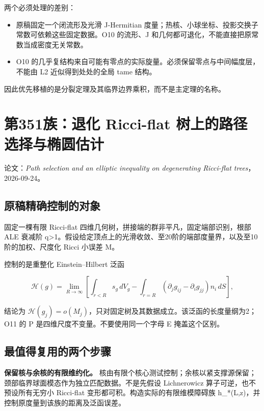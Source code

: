 \documentclass[UTF8,11pt,openany,oneside,fontset=none]{ctexbook}
\providecommand{\tightlist}{\setlength{\itemsep}{1pt}\setlength{\parskip}{0pt}}
\begin{document}
两个必须处理的差别：

\begin{itemize}
\tightlist
\item
  原稿固定一个闭流形及光滑 J-Hermitian 度量；热核、小球坐标、投影交换子常数可依赖这些固定数据。O10 的流形、J 和几何都可退化，不能直接把原常数当成密度无关常数。
\item
  O10 的几乎复结构来自可能有零点的实际旋量。必须保留零点与中间幅度层，不能由 L2 近似得到处处的全局 tame 结构。
\end{itemize}

因此优先移植的是分裂定理及其临界边界乘积，而不是主定理的名称。

\section{第351族：退化 Ricci-flat 树上的路径选择与椭圆估计}\label{ch6:ux7b2c351ux65cfux9000ux5316-ricci-flat-ux6811ux4e0aux7684ux8defux5f84ux9009ux62e9ux4e0eux692dux5706ux4f30ux8ba1}

论文：\emph{Path selection and an elliptic inequality on degenerating Ricci-flat trees}，2026-09-24。\cite{OAITree}

\subsection{原稿精确控制的对象}\label{ch6:ux539fux7a3fux7cbeux786eux63a7ux5236ux7684ux5bf9ux8c61}

固定一棵有限 Ricci-flat 四维几何树，拼接端的群非平凡，固定端部识别，根部 ALE 衰减阶 q\textgreater1。假设给定顶点上的光滑收敛、至20阶的端部度量界，以及至10阶的加权、尺度化 Ricci 小误差 M。

控制的是重整化 Einstein--Hilbert 泛函

\[
\mathscr H(g)=\lim_{R\to\infty}
\left[\int_{r<R}s_g\,dV_g-
\int_{r=R}(\partial_jg_{ij}-\partial_ig_{jj})n_i\,dS\right],
\]

结论为 \(\mathscr H(g_j)=o(M_j)\)，只对固定树及其数据成立。该泛函的长度量纲为2；O11 的 P 是四维尺度不变量。不要使用同一个字母 E 掩盖这个区别。

\subsection{最值得复用的两个步骤}\label{ch6:ux6700ux503cux5f97ux590dux7528ux7684ux4e24ux4e2aux6b65ux9aa4}

\textbf{保留核与余核的有限维约化。} 核由有限个核心测试控制；余核以紧支撑源保留；颈部临界球面模态作为独立匹配数据。不是先假设 Lichnerowicz 算子可逆，也不预设所有无穷小 Ricci-flat 变形都可积。构造实际的有限维模障碍族 h\_*(L,z)，并控制原度量到该族的距离及泛函误差。
\end{document}
